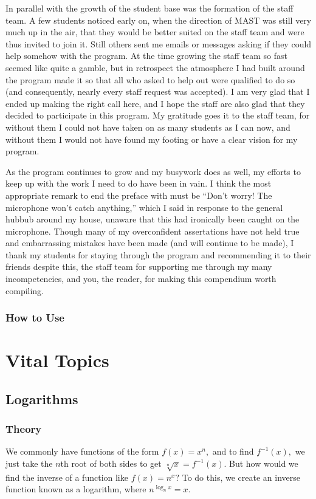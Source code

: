 \documentclass[blue,onecol]{shooting}
\begin{document}
In parallel with the growth of the student base was the formation of the staff team. A few students noticed early on, when the direction of MAST was still very much up in the air, that they would be better suited on the staff team and were thus invited to join it. Still others sent me emails or messages asking if they could help somehow with the program. At the time growing the staff team so fast seemed like quite a gamble, but in retrospect the atmosphere I had built around the program made it so that all who asked to help out were qualified to do so (and consequently, nearly every staff request was accepted). I am very glad that I ended up making the right call here, and I hope the staff are also glad that they decided to participate in this program. My gratitude goes it to the staff team, for without them I could not have taken on as many students as I can now, and without them I would not have found my footing or have a clear vision for my program.

As the program continues to grow and my busywork does as well, my efforts to keep up with the work I need to do have been in vain. I think the most appropriate remark to end the preface with must be ``Don't worry! The microphone won't catch anything,'' which I said in response to the general hubbub around my house, unaware that this had ironically been caught on the microphone. Though many of my overconfident assertations have not held true and embarrassing mistakes have been made (and will continue to be made), I thank my students for staying through the program and recommending it to their friends despite this, the staff team for supporting me through my many incompetencies, and you, the reader, for making this compendium worth compiling.

\pagebreak

\section*{How to Use}

\pagebreak

\toc

\part{Vital Topics}

\chapter{Logarithms}
\section{Theory}
We commonly have functions of the form $f(x)=x^n,$ and to find $f^{-1}(x),$ we just take the $n$th root of both sides to get $\sqrt[n]{x}=f^{-1}(x).$ But how would we find the inverse of a function like $f(x)=n^x?$ To do this, we create an inverse function known as a logarithm, where $n^{\log_nx}=x.$
\end{document}
